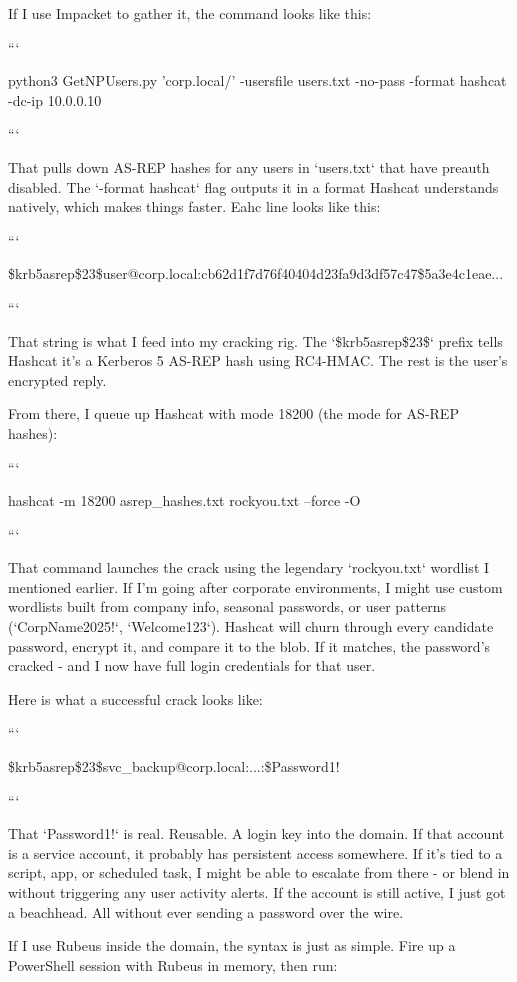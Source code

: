 If I use Impacket to gather it, the command looks like this:

```

python3 GetNPUsers.py 'corp.local/' -usersfile users.txt -no-pass -format hashcat -dc-ip 10.0.0.10

```

That pulls down AS-REP hashes for any users in `users.txt` that have preauth disabled. The `-format hashcat` flag outputs it in a format Hashcat understands natively, which makes things faster. Eahc line looks like this:

```

\$krb5asrep\$23\$user@corp.local:cb62d1f7d76f40404d23fa9d3df57c47\$5a3e4c1eae...

```

That string is what I feed into my cracking rig. The `\$krb5asrep\$23\$` prefix tells Hashcat it’s a Kerberos 5 AS-REP hash using RC4-HMAC. The rest is the user’s encrypted reply.

From there, I queue up Hashcat with mode 18200 (the mode for AS-REP hashes):

```

hashcat -m 18200 asrep\_hashes.txt rockyou.txt --force -O

```

That command launches the crack using the legendary `rockyou.txt` wordlist I mentioned earlier. If I’m going after corporate environments, I might use custom wordlists built from company info, seasonal passwords, or user patterns (`CorpName2025!`, `Welcome123`). Hashcat will churn through every candidate password, encrypt it, and compare it to the blob. If it matches, the password’s cracked - and I now have full login credentials for that user.

Here is what a successful crack looks like:

```

\$krb5asrep\$23\$svc\_backup@corp.local:...:\$Password1!

```

That `Password1!` is real. Reusable. A login key into the domain. If that account is a service account, it probably has persistent access somewhere. If it’s tied to a script, app, or scheduled task, I might be able to escalate from there - or blend in without triggering any user activity alerts. If the account is still active, I just got a beachhead. All without ever sending a password over the wire.

If I use Rubeus inside the domain, the syntax is just as simple. Fire up a PowerShell session with Rubeus in memory, then run:

